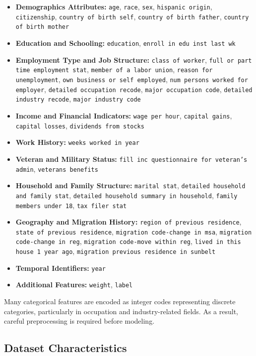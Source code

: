 \begin{itemize}
	\item \textbf{Demographics Attributes:} \texttt{age}, \texttt{race}, \texttt{sex}, \texttt{hispanic origin}, \texttt{citizenship}, \texttt{country of birth self}, \texttt{country of birth father}, \texttt{country of birth mother}
	\item \textbf{Education and Schooling:} \texttt{education}, \texttt{enroll in edu inst last wk}
	\item \textbf{Employment Type and Job Structure:} \texttt{class of worker}, \texttt{full or part time employment stat}, \texttt{member of a labor union}, \texttt{reason for unemployment}, \texttt{own business or self employed}, \texttt{num persons worked for employer}, \texttt{detailed occupation recode}, \texttt{major occupation code}, \texttt{detailed industry recode}, \texttt{major industry code}
	\item \textbf{Income and Financial Indicators:} \texttt{wage per hour}, \texttt{capital gains}, \texttt{capital losses}, \texttt{dividends from stocks}
	\item \textbf{Work History:} \texttt{weeks worked in year}
	\item \textbf{Veteran and Military Status:} \texttt{fill inc questionnaire for veteran's admin}, \texttt{veterans benefits}
	\item \textbf{Household and Family Structure:} \texttt{marital stat}, \texttt{detailed household and family stat}, \texttt{detailed household summary in household}, \texttt{family members under 18}, \texttt{tax filer stat}
	\item \textbf{Geography and Migration History:} \texttt{region of previous residence}, \texttt{state of previous residence}, \texttt{migration code-change in msa}, \texttt{migration code-change in reg}, \texttt{migration code-move within reg}, \texttt{lived in this house 1 year ago}, \texttt{migration previous residence in sunbelt}
	\item \textbf{Temporal Identifiers:} \texttt{year}
	\item \textbf{Additional Features:} \texttt{weight}, \texttt{label}
\end{itemize}

Many categorical features are encoded as integer codes representing discrete categories, particularly in occupation and industry-related fields. As a result, careful preprocessing is required before modeling.

\subsection{Dataset Characteristics}

